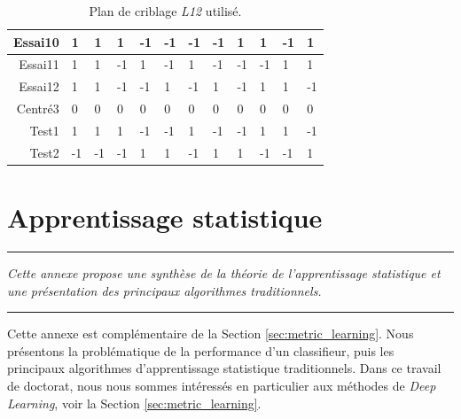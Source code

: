 \begin{table}[h!]
\begin{tabular}{m|m|m|m|m|m|m|m|m|m|m|m|}
		\multicolumn{1}{|r|}{Essai10} & 1      & 1       & 1      & -1     & -1    & -1    & -1    & 1      & 1     & -1     & 1     \\ \hline
		\multicolumn{1}{|r|}{Essai11} & 1      & 1       & -1     & 1      & -1    & 1     & -1    & -1     & -1    & 1      & 1     \\ \hline
		\multicolumn{1}{|r|}{Essai12} & 1      & 1       & -1     & -1     & 1     & -1    & 1     & -1     & 1     & 1      & -1    \\ \hline
		\multicolumn{1}{|r|}{Centré3} & 0      & 0       & 0      & 0      & 0     & 0     & 0     & 0      & 0     & 0      & 0     \\ \hline
		\multicolumn{1}{|r|}{Test1}   & 1      & 1       & 1      & -1     & -1    & 1     & -1    & -1     & 1     & 1      & -1    \\ \hline
		\multicolumn{1}{|r|}{Test2}   & -1     & -1      & -1     & 1      & 1     & -1    & 1     & 1      & -1    & -1     & 1     \\ \hline
	\end{tabular}
	\caption{Plan de criblage \textit{L12} utilisé.}
	\label{tab:doe_screening}
\end{table}


\FloatBarrier
\chapter{Apprentissage statistique}
\label{Ann:3}


\begin{center}
	\rule{0.7\linewidth}{.5pt}
	\begin{minipage}{0.7\linewidth}
		\smallskip
		
		\textit{
			Cette annexe propose une synthèse de la théorie de l'apprentissage statistique et une présentation des principaux algorithmes traditionnels.
		}
		
	\end{minipage}
	\smallskip
	\rule{0.7\linewidth}{.5pt}
\end{center}

\bigskip

Cette annexe est complémentaire de la Section \ref{sec:metric_learning}.
Nous présentons la problématique de la performance d'un classifieur, puis les principaux algorithmes d'apprentissage statistique traditionnels.
Dans ce travail de doctorat, nous nous sommes intéressés en particulier aux méthodes de \textit{Deep Learning}, voir la Section \ref{sec:metric_learning}.


